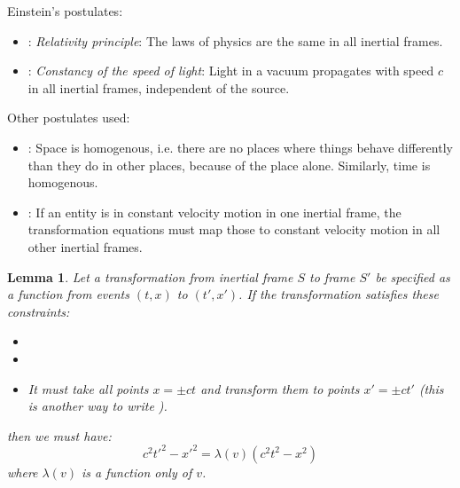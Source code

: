 \documentclass[a4paper]{article}
\theoremstyle{plain}
\newtheorem{lemma}[theorem]{Lemma}
\theoremstyle{definition}
\begin{document}
Einstein's postulates:
\begin{itemize}
\item \erp: {\em Relativity principle}: The laws of physics are the
  same in all inertial frames.
\item \esol: {\em Constancy of the speed of light}: Light in a vacuum
  propagates with speed $c$ in all inertial frames, independent of the
  source.
\end{itemize}
Other postulates used:
\begin{itemize}
\item \homogeneity: Space is homogenous, i.e. there are no places
  where things behave differently than they do in other places,
  because of the place alone.  Similarly, time is homogenous.
\item \linearity: If an entity is in constant velocity motion in one
  inertial frame, the transformation equations must map those to
  constant velocity motion in all other inertial frames.
\end{itemize}

\begin{lemma}
Let a transformation from inertial frame $S$ to frame $S'$ be
specified as a function from events $(t, x)$ to $(t', x')$.
If the transformation satisfies these constraints:
\begin{itemize}
\item \homogeneity
\item \linearity
\item It must take all points $x = \pm ct$ and transform them to
  points $x' = \pm ct'$ (this is another way to write \esol).
\end{itemize}
then we must have:
\begin{equation}
c^2 t'^2 - x'^2 = \lambda(v) (c^2 t^2 - x^2)
\end{equation}
where $\lambda(v)$ is a function only of $v$.
\end{lemma}
\end{document}
